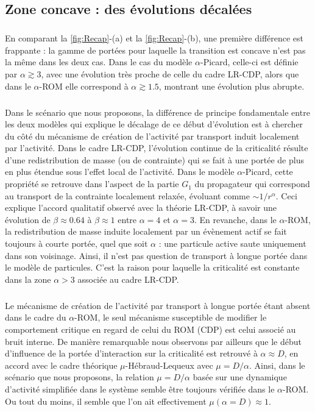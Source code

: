 \subsection{Zone concave : des évolutions décalées}

\subparagraph{}En comparant la \autoref{fig:Recap}-(a) et la \autoref{fig:Recap}-(b), une première différence est frappante : la gamme de portées pour laquelle la transition est concave n'est pas la même dans les deux cas. Dans le cas du modèle $\alpha$-Picard, celle-ci est définie par $\alpha \gtrsim 3$, avec une évolution très proche de celle du cadre LR-CDP, alors que dans le $\alpha$-ROM elle correspond à $\alpha \gtrsim 1.5$, montrant une évolution plus abrupte.

\subparagraph{}Dans le scénario que nous proposons, la différence de principe fondamentale entre les deux modèles qui explique le décalage de ce début d'évolution est à chercher du côté du mécanisme de création de l'activité par transport induit localement par l'activité. Dans le cadre LR-CDP, l'évolution continue de la criticalité résulte d'une redistribution de masse (ou de contrainte) qui se fait à une portée de plus en plus étendue sous l'effet local de l'activité. Dans le modèle $\alpha$-Picard, cette propriété se retrouve dans l'aspect de la partie $G_1$ du propagateur qui correspond au transport de la contrainte localement relaxée, évoluant comme $\sim 1/r^\alpha$. Ceci explique l'accord qualitatif observé avec la théorie LR-CDP, à savoir une évolution de $\beta \approx 0.64$ à $\beta \approx 1$ entre $\alpha = 4$ et $\alpha = 3$. En revanche, dans le $\alpha$-ROM, la redistribution de masse induite localement par un évènement actif se fait toujours à courte portée, quel que soit $\alpha$ : une particule active saute uniquement dans son voisinage. Ainsi, il n'est pas question de transport à longue portée dans le modèle de particules. C'est la raison pour laquelle la criticalité est constante dans la zone $\alpha > 3$ associée au cadre LR-CDP.

\subparagraph{}Le mécanisme de création de l'activité par transport à longue portée étant absent dans le cadre du $\alpha$-ROM, le seul mécanisme susceptible de modifier le comportement critique en regard de celui du ROM (CDP) est celui associé au bruit interne. De manière remarquable nous observons par ailleurs que le début d'influence de la portée d'interaction sur la criticalité est retrouvé à $\alpha \approx D$, en accord avec le cadre théorique $\mu$-Hébraud-Lequeux avec $\mu = D/\alpha$. Ainsi, dans le scénario que nous proposons, la relation $\mu = D/\alpha$ basée sur une dynamique d'activité simplifiée dans le système semble être toujours vérifiée dans le $\alpha$-ROM. Ou tout du moins, il semble que l'on ait effectivement $\mu(\alpha = D) \approx 1$.

